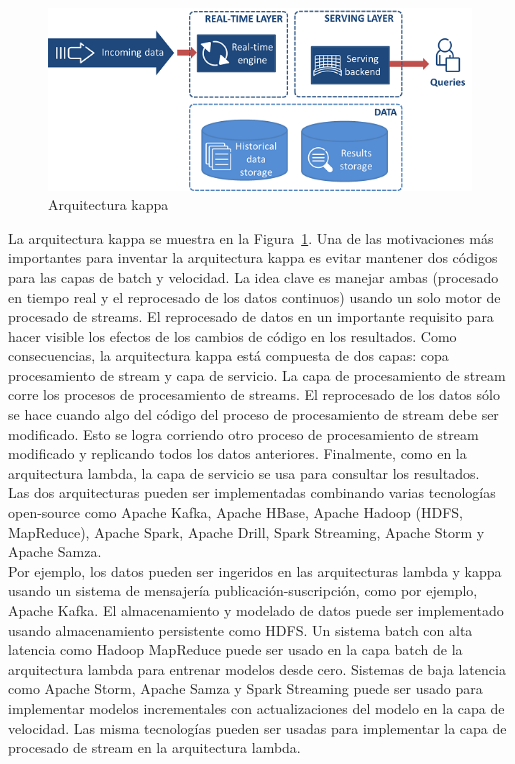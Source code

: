 \documentclass[12pt,a4paper,twoside,openright,titlepage,final]{article}
\begin{document}
\begin{figure}[tbph!]
	\centering
	\includegraphics[width=0.7\linewidth]{imagenes/Kappa}
	\caption{Arquitectura kappa}
	\label{fig:Kappa}
\end{figure}  

La arquitectura kappa se muestra en la Figura~\ref{fig:Kappa}. Una de las motivaciones más importantes para inventar la arquitectura kappa es evitar mantener dos códigos para las capas de batch y velocidad. La idea clave es manejar ambas (procesado en tiempo real y el reprocesado de los datos continuos) usando un solo motor de procesado de streams. El reprocesado de datos en un importante requisito para hacer visible los efectos de los cambios de código en los resultados. Como consecuencias, la arquitectura kappa está compuesta de dos capas: copa procesamiento de stream y capa de servicio. La capa de procesamiento de stream corre los procesos de procesamiento de streams. El reprocesado de los datos sólo se hace cuando algo del código del proceso de procesamiento de stream debe ser modificado. Esto se logra corriendo otro proceso de procesamiento de stream modificado y replicando todos los datos anteriores. Finalmente, como en la arquitectura lambda, la capa de servicio se usa para consultar los resultados.\\

Las dos arquitecturas pueden ser implementadas combinando varias tecnologías open-source como Apache Kafka, Apache HBase, Apache Hadoop (HDFS, MapReduce), Apache Spark, Apache Drill, Spark Streaming, Apache Storm y Apache Samza.\\

Por ejemplo, los datos pueden ser ingeridos en las arquitecturas lambda y kappa usando un sistema de mensajería publicación-suscripción, como por ejemplo, Apache Kafka. El almacenamiento y modelado de datos puede ser implementado usando almacenamiento persistente como HDFS. Un sistema batch con alta latencia como Hadoop MapReduce puede ser usado en la capa batch de la arquitectura lambda para entrenar modelos desde cero. Sistemas de baja latencia como Apache Storm, Apache Samza y Spark Streaming puede ser usado para implementar modelos incrementales con actualizaciones del modelo en la capa de velocidad. Las misma tecnologías pueden ser usadas para implementar la capa de procesado de stream en la arquitectura lambda.\\
\end{document}
